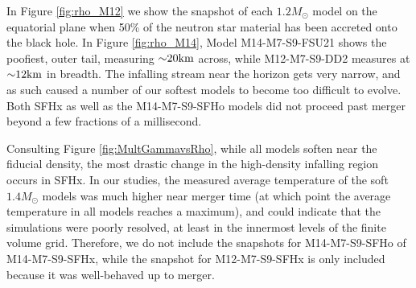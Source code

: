 In Figure \ref{fig:rho_M12} we show the snapshot of each $1.2 M_\odot$ model on the equatorial plane when 50\% of the neutron star material has been accreted onto the black hole.  In Figure \ref{fig:rho_M14}, Model M14-M7-S9-FSU21 shows the poofiest, outer tail, measuring $\mathord{\sim} 20 {\rm km}$ across, while M12-M7-S9-DD2 measures at $\mathord{\sim} 12 {\rm km}$ in breadth.  The infalling stream near the horizon gets very narrow, and as such caused a number of our softest models to become too difficult to evolve.  Both SFHx as well as the M14-M7-S9-SFHo models did not proceed past merger beyond a few fractions of a millisecond.  

Consulting Figure \ref{fig:MultGammavsRho}, while all models soften near the fiducial density, the most drastic change in the high-density infalling region occurs in SFHx.  In our studies, the measured average temperature of the soft $1.4 M_\odot$ models was much higher near merger time (at which point the average temperature in all models reaches a maximum), and could indicate that the simulations were poorly resolved, at least in the innermost levels of the finite volume grid.  Therefore, we do not include the snapshots for M14-M7-S9-SFHo of M14-M7-S9-SFHx, while the snapshot for M12-M7-S9-SFHx is only included because it was well-behaved up to merger.

